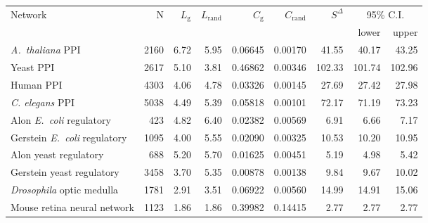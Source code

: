 \begin{tabular}{lrrrrrrrr}
\hline
Network & N  & $L_{\mathrm{g}}$ & $L_{\mathrm{rand}}$ & $C_{\mathrm{g}}$ & $C_{\mathrm{rand}}$ &  $S^{\Delta}$ & \multicolumn{2}{c}{95\% C.I.}\\
        &    &                   &                      &                   &                      &             &  lower   & upper \\
\hline
\textit{A.~thaliana} PPI & 2160 & 6.72 & 5.95 & 0.06645 & 0.00170 & 41.55 & 40.17 & 43.25\\
Yeast PPI & 2617 & 5.10 & 3.81 & 0.46862 & 0.00346 & 102.33 & 101.74 & 102.96\\
Human PPI & 4303 & 4.06 & 4.78 & 0.03326 & 0.00145 & 27.69 & 27.42 & 27.98\\
\textit{C. elegans} PPI & 5038 & 4.49 & 5.39 & 0.05818 & 0.00101 & 72.17 & 71.19 & 73.23\\
Alon \textit{E.~coli} regulatory & 423 & 4.82 & 6.40 & 0.02382 & 0.00569 & 6.91 & 6.66 & 7.17\\
Gerstein \textit{E.~coli} regulatory & 1095 & 4.00 & 5.55 & 0.02090 & 0.00325 & 10.53 & 10.20 & 10.95\\
Alon yeast regulatory & 688 & 5.20 & 5.70 & 0.01625 & 0.00451 & 5.19 & 4.98 & 5.42\\
Gerstein yeast regulatory & 3458 & 3.70 & 5.35 & 0.00878 & 0.00138 & 9.84 & 9.67 & 10.02\\
\textit{Drosophila} optic medulla & 1781 & 2.91 & 3.51 & 0.06922 & 0.00560 & 14.99 & 14.91 & 15.06\\
Mouse retina neural network & 1123 & 1.86 & 1.86 & 0.39982 & 0.14415 & 2.77 & 2.77 & 2.77\\
\hline
\end{tabular}
